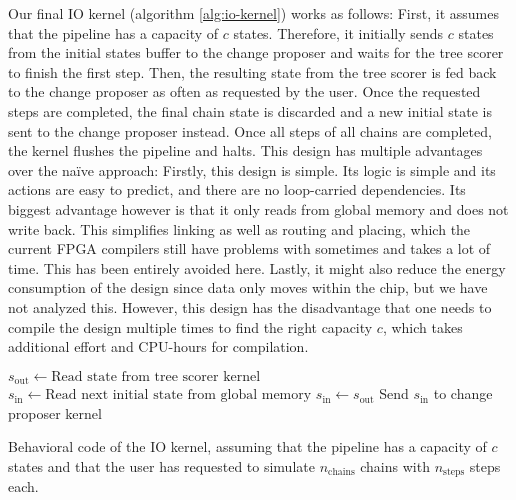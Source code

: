 Our final IO kernel (algorithm \ref{alg:io-kernel}) works as follows: First, it assumes that the pipeline has a capacity of $c$ states. Therefore, it initially sends $c$ states from the initial states buffer to the change proposer and waits for the tree scorer to finish the first step. Then, the resulting state from the tree scorer is fed back to the change proposer as often as requested by the user. Once the requested steps are completed, the final chain state is discarded and a new initial state is sent to the change proposer instead. Once all steps of all chains are completed, the kernel flushes the pipeline and halts. This design has multiple advantages over the na\"ive approach: Firstly, this design is simple. Its logic is simple and its actions are easy to predict, and there are no loop-carried dependencies. Its biggest advantage however is that it only reads from global memory and does not write back. This simplifies linking as well as routing and placing, which the current \ac{FPGA} compilers still have problems with sometimes and takes a lot of time. This has been entirely avoided here. Lastly, it might also reduce the energy consumption of the design since data only moves within the chip, but we have not analyzed this. However, this design has the disadvantage that one needs to compile the design multiple times to find the right capacity $c$, which takes additional effort and \ac{CPU}-hours for compilation.

\begin{algorithm}
    \begin{algorithmic}
                \State $s_\mathrm{out} \leftarrow \text{Read state from tree scorer kernel}$
            \EndIf
                    \State $s_\mathrm{in} \leftarrow \text{Read next initial state from global memory}$
                \Else
                    \State $s_\mathrm{in} \leftarrow s_\mathrm{out}$
                \EndIf
                \State Send $s_\mathrm{in}$ to change proposer kernel
            \EndIf
        \EndFor
    \end{algorithmic}
    \caption{Behavioral code of the IO kernel, assuming that the pipeline has a capacity of $c$ states and that the user has requested to simulate $n_\mathrm{chains}$ chains with $n_\mathrm{steps}$ steps each.}
    \label{alg:io-kernel}
\end{algorithm}

